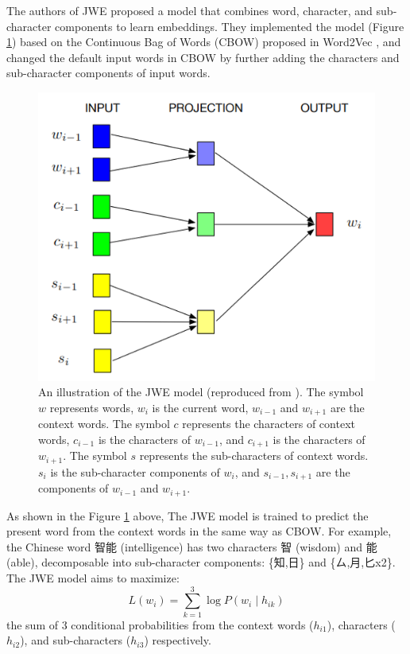 The authors of JWE \cite{yu2017joint} proposed a model that combines word, character, and sub-character components to learn embeddings. They implemented the model (Figure \ref{fig:jwe}) based on the Continuous Bag of Words (CBOW) proposed in Word2Vec \cite{mikolov2013efficient}, and changed the default input words in CBOW by further adding the characters and sub-character components of input words.

\begin{figure}[h]
	\centering
	\includegraphics[scale=0.7]{../images/jwe_illustration.png}
	\caption[An illustration of the JWE model (reproduced from \cite{yu2017joint})]{An illustration of the JWE model (reproduced from \cite{yu2017joint}). The symbol $w$ represents words, $w_i$ is the current word, $w_{i-1}$ and $w_{i+1}$ are the context words. The symbol $c$ represents the characters of context words, $c_{i-1}$ is the characters of $w_{i-1}$, and $c_{i+1}$ is the characters of $w_{i+1}$. The symbol $s$ represents the sub-characters of context words. $s_i$ is the sub-character components of $w_i$, and $s_{i-1}, s_{i+1}$ are the components of $w_{i-1}$ and $w_{i+1}$.}
	\label{fig:jwe}
\end{figure}

As shown in the Figure \ref{fig:jwe} above, The JWE model is trained to predict the present word from the context words in the same way as CBOW.  For example, the Chinese word 智能 (intelligence) has two characters 智 (wisdom) and 能 (able), decomposable into sub-character components: \{知,日\} and \{ㄙ,月,匕x2\}. The JWE model aims to maximize:
\begin{equation*}
L(w_i) = \sum_{k=1}^3\log P(w_i\mid h_{ik})    
\end{equation*}
the sum of 3 conditional probabilities from the context words ($h_{i1}$), characters ($h_{i2}$), and sub-characters ($h_{i3}$) respectively.

